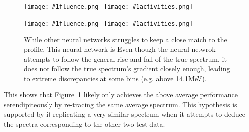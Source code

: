 \documentclass[a4paper, 12pt]{article}
\newcommand{\fluenceandactivities}[1]{
\texttt{[image: \#1fluence.png]}
\texttt{[image: \#1activities.png]}
}
\begin{document}
\begin{figure}
\centering
\fluenceandactivities{/home/ocean/Documents/GitHubDir/unfolding/unfolding/unfoldingsuite/neuralnetwork/realoutputEarlyStopping/SelectedNNreplicated/fusion-fusion/0918_0332_5_layer_top_right_anomaly_test_001_}
\caption{}\label{5Layerfusion-fusionJET-FW}
\end{figure}

\begin{figure}
\centering
\fluenceandactivities{/home/ocean/Documents/GitHubDir/unfolding/unfolding/unfoldingsuite/neuralnetwork/realoutputEarlyStopping/SelectedNNreplicated/fusion-fusion/0918_0332_3_layer_typical_mpse_test_001_}
\caption{While other neural networks struggles to keep a close match to the profile. This neural network is Even though the neural netwrok attempts to follow the general rise-and-fall of the true spectrum, it does not follow the true spectrum's gradient closely enough, leading to extreme discrepancies at some bins (e.g. above 14.1MeV).}\label{3Layerfusion-fusionJET-FW}
\end{figure}

This shows that Figure~\ref{5Layerfusion-fusionJET-FW} likely only achieves the above average performance serendipiteously by re-tracing the same average spectrum. This hypothesis is supported by it replicating a very similar spectrum when it attempts to deduce the spectra corresponding to the other two test data.



\end{document}
